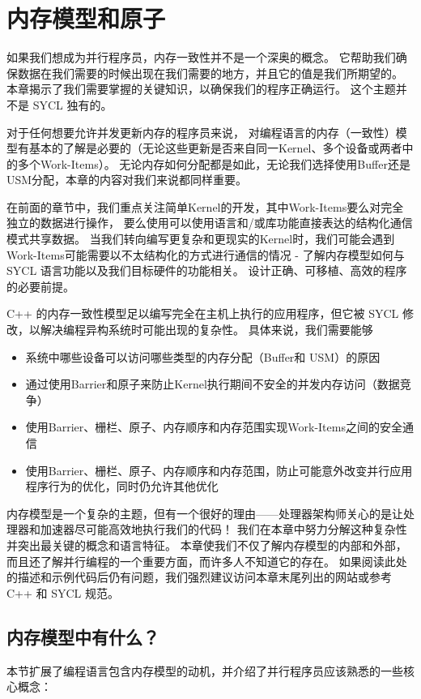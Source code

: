 \section{内存模型和原子}
如果我们想成为并行程序员，内存一致性并不是一个深奥的概念。 
它帮助我们确保数据在我们需要的时候出现在我们需要的地方，并且它的值是我们所期望的。 
本章揭示了我们需要掌握的关键知识，以确保我们的程序正确运行。 这个主题并不是 SYCL 独有的。

对于任何想要允许并发更新内存的程序员来说，
对编程语言的内存（一致性）模型有基本的了解是必要的（无论这些更新是否来自同一Kernel、多个设备或两者中的多个Work-Items）。 
无论内存如何分配都是如此，无论我们选择使用Buffer还是USM分配，本章的内容对我们来说都同样重要。

在前面的章节中，我们重点关注简单Kernel的开发，其中Work-Items要么对完全独立的数据进行操作，
要么使用可以使用语言和/或库功能直接表达的结构化通信模式共享数据。 
当我们转向编写更复杂和更现实的Kernel时，我们可能会遇到Work-Items可能需要以不太结构化的方式进行通信的情况 - 
了解内存模型如何与 SYCL 语言功能以及我们目标硬件的功能相关。 设计正确、可移植、高效的程序的必要前提。

C++ 的内存一致性模型足以编写完全在主机上执行的应用程序，但它被 SYCL 修改，以解决编程异构系统时可能出现的复杂性。 
具体来说，我们需要能够

\begin{itemize}
	\item 系统中哪些设备可以访问哪些类型的内存分配（Buffer和 USM）的原因

	\item 通过使用Barrier和原子来防止Kernel执行期间不安全的并发内存访问（数据竞争）

	\item 使用Barrier、栅栏、原子、内存顺序和内存范围实现Work-Items之间的安全通信

	\item 使用Barrier、栅栏、原子、内存顺序和内存范围，防止可能意外改变并行应用程序行为的优化，同时仍允许其他优化
\end{itemize}

内存模型是一个复杂的主题，但有一个很好的理由——处理器架构师关心的是让处理器和加速器尽可能高效地执行我们的代码！ 
我们在本章中努力分解这种复杂性并突出最关键的概念和语言特征。 
本章使我们不仅了解内存模型的内部和外部，而且还了解并行编程的一个重要方面，而许多人不知道它的存在。 
如果阅读此处的描述和示例代码后仍有问题，我们强烈建议访问本章末尾列出的网站或参考 C++ 和 SYCL 规范。

\subsection{内存模型中有什么？}
本节扩展了编程语言包含内存模型的动机，并介绍了并行程序员应该熟悉的一些核心概念：

